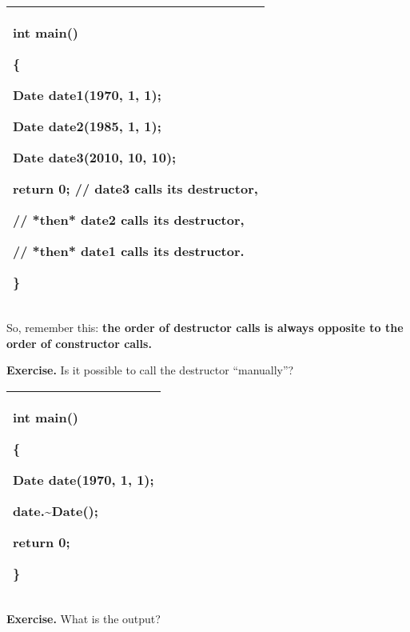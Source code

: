 \documentclass[
]{article}
\begin{document}
\begin{longtable}[]{@{}l@{}}
\toprule
\endhead
\begin{minipage}[t]{0.97\columnwidth}\raggedright
int main()

\{

Date date1(1970, 1, 1);

Date date2(1985, 1, 1);

Date date3(2010, 10, 10);

return 0; // date3 calls its destructor,

// *then* date2 calls its destructor,

// *then* date1 calls its destructor.

\}\strut
\end{minipage}\tabularnewline
\bottomrule
\end{longtable}

So, remember this: \textbf{the order of destructor calls is always
opposite to the order of constructor calls.}

\textbf{Exercise.} Is it possible to call the destructor ``manually''?

\begin{longtable}[]{@{}l@{}}
\toprule
\endhead
\begin{minipage}[t]{0.97\columnwidth}\raggedright
int main()

\{

Date date(1970, 1, 1);

date.\textasciitilde Date();

return 0;

\}\strut
\end{minipage}\tabularnewline
\bottomrule
\end{longtable}

\textbf{Exercise.} What is the output?
\end{document}

